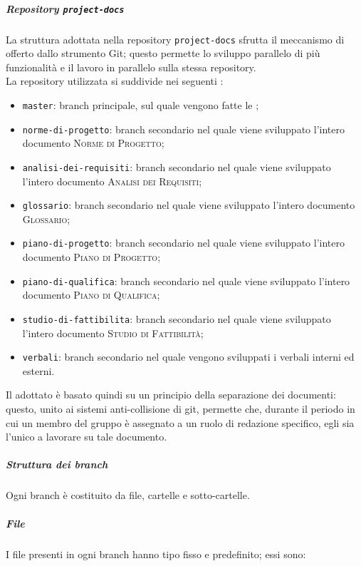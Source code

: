\documentclass[../norme-di-progetto.tex]{subfiles}
\begin{document}
\subparagraph{Repository \texttt{project-docs}}
La struttura adottata nella repository \texttt{project-docs} sfrutta il meccanismo di  offerto dallo strumento Git; questo permette lo sviluppo parallelo di più funzionalità e il lavoro in parallelo sulla stessa repository. \\
La repository utilizzata si suddivide nei seguenti :
\begin{itemize}
  \item \texttt{master}: branch principale, sul quale vengono fatte le ;
  \item \texttt{norme-di-progetto}: branch secondario nel quale viene sviluppato l'intero documento \textsc{Norme di Progetto};
  \item \texttt{analisi-dei-requisiti}: branch secondario nel quale viene sviluppato l'intero documento \textsc{Analisi dei Requisiti};
  \item \texttt{glossario}: branch secondario nel quale viene sviluppato l'intero documento \textsc{Glossario};
  \item \texttt{piano-di-progetto}: branch secondario nel quale viene sviluppato l'intero documento \textsc{Piano di Progetto};
  \item \texttt{piano-di-qualifica}: branch secondario nel quale viene sviluppato l'intero documento \textsc{Piano di Qualifica};
  \item \texttt{studio-di-fattibilita}: branch secondario nel quale viene sviluppato l'intero documento \textsc{Studio di Fattibilità};
  \item \texttt{verbali}: branch secondario nel quale vengono sviluppati i verbali interni ed esterni.
\end{itemize}
Il  adottato è basato quindi su un principio della separazione dei documenti: questo, unito ai sistemi anti-collisione di git, permette che, durante il periodo in cui un membro del gruppo è assegnato a un ruolo di redazione specifico, egli sia l'unico a lavorare su tale documento.
\subparagraph*{Struttura dei branch}
Ogni branch è costituito da file, cartelle e sotto-cartelle.
\subparagraph*{File}
I file presenti in ogni branch hanno tipo fisso e predefinito; essi sono:
\end{document}
